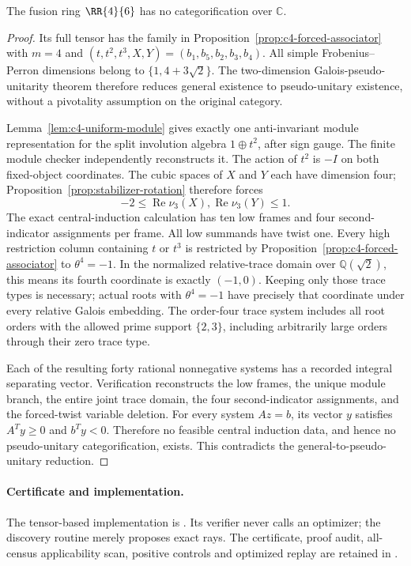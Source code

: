 \begin{theorem}\label{thm:c4-multiplicity-four}
The fusion ring $\RR{4}{6}$ has no categorification over $\mathbb C$.
\end{theorem}
\begin{proof}
Its full tensor has the family in
Proposition~\ref{prop:c4-forced-associator} with $m=4$ and
$(t,t^2,t^3,X,Y)=(b_1,b_5,b_2,b_3,b_4)$.
All simple Frobenius--Perron dimensions belong to
$\{1,4+3\sqrt2\}$. The two-dimension Galois-pseudo-unitarity
theorem therefore reduces general existence to pseudo-unitary
existence, without a pivotality assumption on the original category.

Lemma~\ref{lem:c4-uniform-module} gives exactly one anti-invariant
module representation for the split involution algebra $1\oplus t^2$,
after sign gauge. The finite module checker independently reconstructs it.
The action of $t^2$ is $-I$ on both fixed-object coordinates.
The cubic spaces of $X$ and $Y$ each have dimension four;
Proposition~\ref{prop:stabilizer-rotation} therefore forces
\[
 -2\leq\operatorname{Re}\nu_3(X),
          \operatorname{Re}\nu_3(Y)\leq1.
\]
The exact central-induction calculation has ten low frames and
four second-indicator assignments per frame. All low summands
have twist one. Every high restriction column containing $t$ or
$t^3$ is restricted by Proposition~\ref{prop:c4-forced-associator}
to $\theta^4=-1$. In the normalized relative-trace domain over
$\mathbb Q(\sqrt2)$, this means its fourth coordinate is exactly
$(-1,0)$. Keeping only those trace types is necessary; actual roots
with $\theta^4=-1$ have precisely that coordinate under every
relative Galois embedding. The order-four trace system includes
all root orders with the allowed prime support $\{2,3\}$,
including arbitrarily large orders through their zero trace type.

Each of the resulting forty rational nonnegative systems has a
recorded integral separating vector. Verification reconstructs
the low frames, the unique module branch, the entire joint trace
domain, the four second-indicator assignments, and the forced-twist
variable deletion. For every system $Az=b$, its vector $y$
satisfies $A^Ty\geq0$ and $b^Ty<0$. Therefore no feasible central
induction data, and hence no pseudo-unitary categorification,
exists. This contradicts the general-to-pseudo-unitary reduction.
\end{proof}

\paragraph{Certificate and implementation.}
The tensor-based implementation is
. Its verifier never calls
an optimizer; the discovery routine merely proposes exact rays.
The certificate, proof audit, all-census applicability scan,
positive controls and optimized replay are retained in
.

